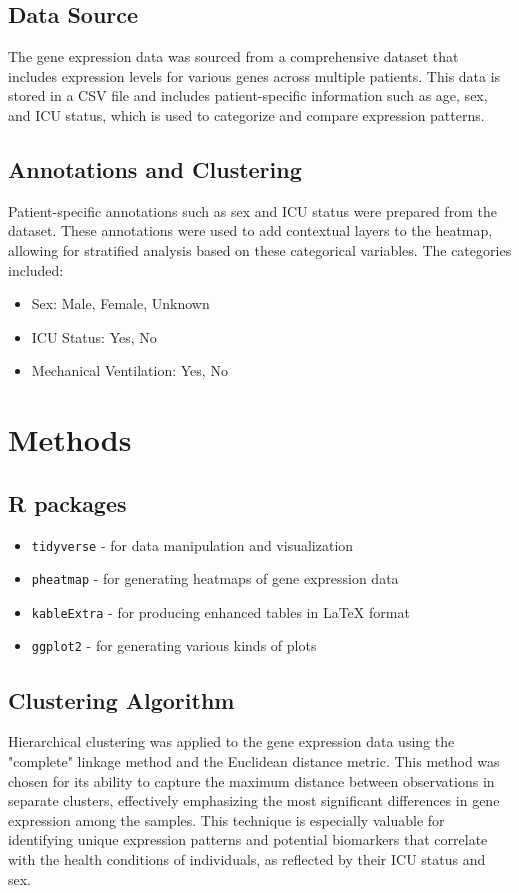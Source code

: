 \documentclass{article}
\begin{document}
\subsection{Data Source}
The gene expression data was sourced from a comprehensive dataset that includes expression levels for various genes across multiple patients.\cite{Overmyer2021} This data is stored in a CSV file and includes patient-specific information such as age, sex, and ICU status, which is used to categorize and compare expression patterns.
\subsection{Annotations and Clustering}
Patient-specific annotations such as sex and ICU status were prepared from the dataset. These annotations were used to add contextual layers to the heatmap, allowing for stratified analysis based on these categorical variables. The categories included:
\begin{itemize}
    \item Sex: Male, Female, Unknown
    \item ICU Status: Yes, No
    \item Mechanical Ventilation: Yes, No
\end{itemize}
\section{Methods}
\subsection{R packages}

\begin{itemize}
    \item \texttt{tidyverse} - for data manipulation and visualization \cite{Wickham2019}
    \item \texttt{pheatmap} - for generating heatmaps of gene expression data\cite{Kolde2022}
    \item \texttt{kableExtra} - for producing enhanced tables in LaTeX format \cite{Zhu2018}
    \item \texttt{ggplot2} - for generating various kinds of plots
\end{itemize}
\subsection{Clustering Algorithm}

Hierarchical clustering was applied to the gene expression data using the "complete" linkage method and the Euclidean distance metric. This method was chosen for its ability to capture the maximum distance between observations in separate clusters, effectively emphasizing the most significant differences in gene expression among the samples. This technique is especially valuable for identifying unique expression patterns and potential biomarkers that correlate with the health conditions of individuals, as reflected by their ICU status and sex.
\end{document}
